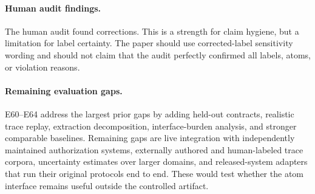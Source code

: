 \paragraph{Human audit findings.}
The human audit found corrections. This is a strength for claim hygiene, but a limitation for label certainty. The paper should use corrected-label sensitivity wording and should not claim that the audit perfectly confirmed all labels, atoms, or violation reasons.

\paragraph{Remaining evaluation gaps.}
E60--E64 address the largest prior gaps by adding held-out contracts, realistic trace replay, extraction decomposition, interface-burden analysis, and stronger comparable baselines. Remaining gaps are live integration with independently maintained authorization systems, externally authored and human-labeled trace corpora, uncertainty estimates over larger domains, and released-system adapters that run their original protocols end to end. These would test whether the atom interface remains useful outside the controlled artifact.
